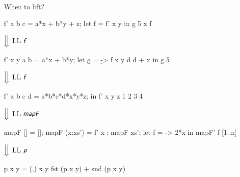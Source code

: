 \documentclass{haskellbeamer}
\newcommand{\id}[1]{\textsf{\textsl{#1}}\xspace}
\newcommand{\idf}{\id{f}}
\begin{document}
\begin{frame}[fragile]{When to lift?}
\begin{center}
\begin{minipage}{0.55\textwidth}
\begin{overprint}
        \begin{haskell}
          f' a b c = a*x + b*y + z;
          let f = f' x y
          in g 5 x f
        \end{haskell}
        \hspace{0.4\textwidth}$\Big\Downarrow$ LL $\idf$
        \begin{haskell}
          f' x y a b = a*x + b*y;
          let g = \d -> f x y d d + x
          in g 5
        \end{haskell}
        \hspace{0.4\textwidth}$\Big\Downarrow$ LL $\idf$
        \begin{haskell}
          f' a b c d = a*b*c*d*x*y*z;
          in f' x y z 1 2 3 4
        \end{haskell}
        \hspace{0.4\textwidth}$\Big\Downarrow$ LL $\id{mapF}$
        \begin{haskell}
          mapF []      = [];
          mapF (x:xs') = f' x : mapF xs';
          let f = \x -> 2*x
          in mapF' f [1..n]
        \end{haskell}
        \hspace{0.4\textwidth}$\Big\Downarrow$ LL $\id{p}$
        \begin{haskell}
          p x y = (,) x y
          fst (p x y) + snd (p x y)
        \end{haskell}
      \end{overprint}
    \end{minipage}
  \end{center}
\end{frame}
\end{document}
